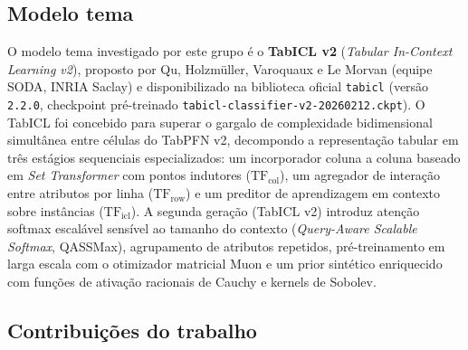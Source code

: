 \documentclass[11pt,a4paper]{article}
\begin{document}
\subsection{Modelo tema}

O modelo tema investigado por este grupo é o \textbf{TabICL v2} (\emph{Tabular In-Context Learning v2}), proposto por Qu, Holzmüller, Varoquaux e Le Morvan \cite{qu2025tabicl,qu2026tabiclv2} (equipe SODA, INRIA Saclay) e disponibilizado na biblioteca oficial \texttt{tabicl} (versão \texttt{2.2.0}, checkpoint pré-treinado \texttt{tabicl-classifier-v2-20260212.ckpt}). O TabICL foi concebido para superar o gargalo de complexidade bidimensional simultânea entre células do TabPFN v2, decompondo a representação tabular em três estágios sequenciais especializados: um incorporador coluna a coluna baseado em \emph{Set Transformer} com pontos indutores ($\mathrm{TF}_{\mathrm{col}}$), um agregador de interação entre atributos por linha ($\mathrm{TF}_{\mathrm{row}}$) e um preditor de aprendizagem em contexto sobre instâncias ($\mathrm{TF}_{\mathrm{icl}}$). A segunda geração (TabICL v2) introduz atenção softmax escalável sensível ao tamanho do contexto (\emph{Query-Aware Scalable Softmax}, QASSMax), agrupamento de atributos repetidos, pré-treinamento em larga escala com o otimizador matricial Muon \cite{jordan2024muon} e um prior sintético enriquecido com funções de ativação racionais de Cauchy e kernels de Sobolev.

\subsection{Contribuições do trabalho}
\end{document}
